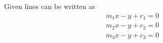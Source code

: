 %
%
    Given lines can be written as \begin{align}
       m_1x-y+c_1=0
    \end{align}
    \begin{align}
        m_2x-y+c_2=0
    \end{align}
    \begin{align}
        m_3x-y+c_3=0
        \label{eq:3}
    \end{align}
    
